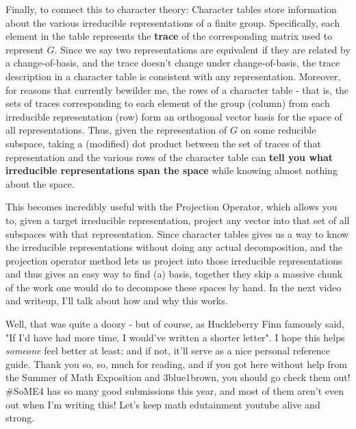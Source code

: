 \documentclass{article}
\begin{document}
Finally, to connect this to character theory: Character tables store information about the various irreducible representations of a finite group. Specifically, each element in the table represents the \textbf{trace} of the corresponding matrix used to represent $G$. Since we say two representations are equivalent if they are related by a change-of-basis, and the trace doesn't change under change-of-basis, the trace description in a character table is consistent with any representation. Moreover, for reasons that currently bewilder me, the rows of a character table - that is, the sets of traces corresponding to each element of the group (column) from each irreducible representation (row) form an orthogonal vector basis for the space of all representations. Thus, given the representation of $G$ on some reducible subspace, taking a (modified) dot product between the set of traces of that representation and the various rows of the character table can \textbf{tell you what irreducible representations span the space} while knowing almost nothing about the space. 

This becomes incredibly useful with the Projection Operator, which allows you to, given a target irreducible representation, project any vector into that set of all subspaces with that representation. Since character tables gives us a way to know the irreducible representations without doing any actual decomposition, and the projection operator method lets us project into those irreducible representations and thus gives an easy way to find (a) basis, together they skip a massive chunk of the work one would do to decompose these spaces by hand. In the next video and writeup, I'll talk about how and why this works.


Well, that was quite a doozy - but of course, as Huckleberry Finn famously said, "If I'd have had more time, I would've written a shorter letter". I hope this helps \textit{someone} feel better at least; and if not, it'll serve as a nice personal reference guide. Thank you so, so, much for reading, and if you got here without help from the Summer of Math Exposition and 3blue1brown, you should go check them out! \#SoME4 has so many good submissions this year, and most of them aren't even out when I'm writing this! Let's keep math edutainment youtube alive and strong.
\end{document}
